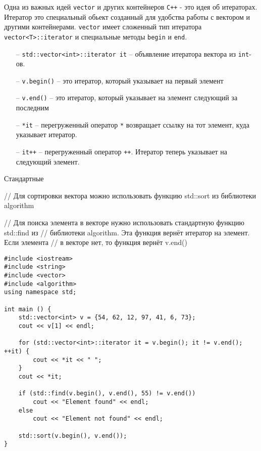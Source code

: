 \documentclass{article}
\begin{document}
\iffalse
Одна из важных идей \texttt{vector} и других контейнеров \texttt{C++} - это идея об итераторах. Итератор это специальный обьект созданный для удобства работы с вектором и другими контейнерами. \texttt{vector} имеет сложенный тип итератора \texttt{vector<T>::iterator} и специальные методы \texttt{begin} и \texttt{end}.
\begin{itemize}
\item[--] \texttt{std::vector<int>::iterator it} -- объявление итератора вектора из \texttt{int}-ов.
\item[--] \texttt{v.begin()} -- это итератор, который указывает на первый элемент
\item[--] \texttt{v.end()} -- это итератор, который указывает на элемент следующий за последним
\item[--] \texttt{*it} -- перегруженный оператор \texttt{*} возвращает ссылку на тот элемент, куда указывает итератор.
\item[--] \texttt{it++} -- перегруженный оператор \texttt{++}. Итератор теперь указывает на следующий элемент.
\end{itemize}
Стандартные 
   
    
        // Для сортировки вектора можно использовать функцию std::sort из библиотеки algorithm
        
          // Для поиска элемента в векторе нужно использовать стандартную функцию std::find из
    // библиотеки algorithm. Эта функция вернёт итератор на элемент. Если элемента
    // в векторе нет, то функция вернёт v.end()

\begin{lstlisting}
#include <iostream>
#include <string>
#include <vector>
#include <algorithm>
using namespace std;

int main () {
    std::vector<int> v = {54, 62, 12, 97, 41, 6, 73};
    cout << v[1] << endl;
    
    for (std::vector<int>::iterator it = v.begin(); it != v.end(); ++it) {
        cout << *it << " ";
    }
    cout << *it;
    
    if (std::find(v.begin(), v.end(), 55) != v.end())
    	cout << "Element found" << endl;
    else
    	cout << "Element not found" << endl;
    	
   	std::sort(v.begin(), v.end());
}
\end{lstlisting}
\end{document}
